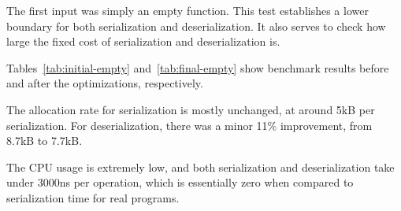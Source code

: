 \documentclass[lettersize,journal]{IEEEtran}
\begin{document}
    The first input was simply an empty function.
    This test establishes a lower boundary for both serialization and deserialization.
    It also serves to check how large the fixed cost of serialization and deserialization is.

    Tables~\ref{tab:initial-empty} and~\ref{tab:final-empty} show benchmark results before and after the optimizations,
    respectively.

    The allocation rate for serialization is mostly unchanged, at around 5kB per serialization.
    For deserialization, there was a minor 11\% improvement, from 8.7kB to 7.7kB\@.

    The CPU usage is extremely low, and both serialization and deserialization take under 3000ns per operation,
    which is essentially zero when compared to serialization time for real programs.
\end{document}

